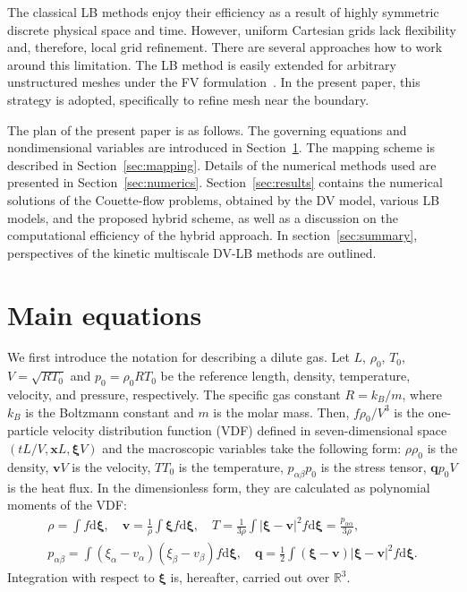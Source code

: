 \documentclass{elsarticle} %
\newcommand{\dd}{\mathrm{d}}
\newcommand{\dxi}{\dd{\boldsymbol{\xi}}}
\newcommand{\bxi}{\boldsymbol{\xi}}
\newcommand{\bv}{\boldsymbol{v}}
\newcommand{\bq}{\boldsymbol{q}}
\newcommand{\bx}{\boldsymbol{x}}
\newcommand{\refer}[1]{#1_0}
\begin{document}
The classical LB methods enjoy their efficiency as a result of highly symmetric discrete physical space and time.
However, uniform Cartesian grids lack flexibility and, therefore, local grid refinement.
There are several approaches how to work around this limitation.
The LB method is easily extended for arbitrary unstructured meshes
under the FV formulation~\cite{Succi1992, Peng1999, Patil2009, Li2016}.
In the present paper, this strategy is adopted, specifically to refine mesh near the boundary.

The plan of the present paper is as follows.
The governing equations and nondimensional variables are introduced in Section~\ref{sec:equations}.
The mapping scheme is described in Section~\ref{sec:mapping}.
Details of the numerical methods used are presented in Section~\ref{sec:numerics}.
Section~\ref{sec:results} contains the numerical solutions of the Couette-flow problems, %
obtained by the DV model, various LB models, and the proposed hybrid scheme,
as well as a discussion on the computational efficiency of the hybrid approach.
In section~\ref{sec:summary}, perspectives of the kinetic multiscale DV-LB methods are outlined.

\section{Main equations}\label{sec:equations}

We first introduce the notation for describing a dilute gas.
Let \(L\), \(\refer\rho\), \(\refer{T}\), \(V = \sqrt{R\refer{T}}\) and \(\refer{p} = \refer{\rho}R\refer{T}\) be
the reference length, density, temperature, velocity, and pressure, respectively.
The specific gas constant \(R = k_B/m\), where \(k_B\) is the Boltzmann constant and \(m\) is the molar mass.
Then, \(f\refer{\rho}/V^3\) is the one-particle velocity distribution function (VDF)
defined in seven-dimensional space \((tL/V, \bx L, \bxi V)\) and
the macroscopic variables take the following form:
\(\rho\refer{\rho}\) is the density, \(\bv V\) is the velocity, \(T\refer{T}\) is the temperature,
\(p_{\alpha\beta}\refer{p}\) is the stress tensor, \(\bq\refer{p}V\) is the heat flux.
In the dimensionless form, they are calculated as polynomial moments of the VDF:
\begin{equation}\label{eq:macro}
    \begin{gathered}
    \rho = \int f \dxi, \quad
    \bv = \frac1{\rho} \int \bxi f \dxi, \quad
    T = \frac{1}{3\rho}\int|\bxi-\bv|^2f \dxi = \frac{p_{\alpha\alpha}}{3\rho}, \\
    p_{\alpha\beta} = \int(\xi_{\alpha}-v_{\alpha})(\xi_{\beta}-v_{\beta}) f \dxi, \quad
    \bq = \frac12\int(\bxi-\bv)|\bxi-\bv|^2 f \dxi.
    \end{gathered}
\end{equation}
Integration with respect to \(\bxi\) is, hereafter, carried out over \(\mathbb{R}^3\).
\end{document}
